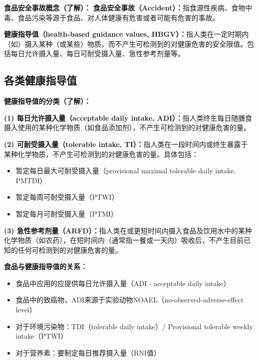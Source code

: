 \begin{tipbox}
\textbf{食品安全事故概念（了解）：}
\textbf{食品安全事故（Accident）：}指食源性疾病、食物中毒、食品污染等源于食品、对人体健康有危害或者可能有危害的事故。

\textbf{健康指导值（health-based guidance values, HBGV）：}指人类在一定时期内（如）摄入某种（或某些）物质，而不产生可检测到的对健康危害的安全限值。包括每日允许摄入量、每日可耐受摄入量、急性参考剂量等。
\end{tipbox}

\subsection{各类健康指导值}

\begin{defbox}
\textbf{健康指导值的分类（了解）：}

\textbf{(1) 每日允许摄入量（acceptable daily intake, ADI）：}指人类终生每日随膳食摄入使用的某种化学物质（如食品添加剂），不产生可检测到的对健康危害的量。

\textbf{(2) 可耐受摄入量（tolerable intake, TI）：}指人类在一段时间内或终生暴露于某种化学物质，不产生可检测到的对健康危害的量。具体包括：
\begin{itemize}[leftmargin=*]
    \item 暂定每日最大可耐受摄入量（provisional maximal tolerable daily intake, PMTDI）
    \item 暂定每周可耐受摄入量（PTWI）
    \item 暂定每月可耐受摄入量（PTMI）
\end{itemize}

\textbf{(3) 急性参考剂量（ARFD）：}指人类在或更短时间内摄入食品及饮用水中的某种化学物质（如农药），在短时间内（通常指一餐或一天内）吸收后，不产生目前已知的任何可检测到的对健康危害的量。

\textbf{食品与健康指导值的关系：}
\begin{itemize}[leftmargin=*]
    \item 食品中应用的应提供每日允许摄入量（ADI - acceptable daily intake）
    \item 食品中的致癌物，ADI来源于实验动物NOAEL（no-observed-adverse-effect level）
    \item 对于环境污染物：TDI（tolerable daily intake）/ Provisional tolerable weekly intake（PTWI）
    \item 对于营养素：要制定每日推荐摄入量（RNI值）
\end{itemize}
\end{defbox}

